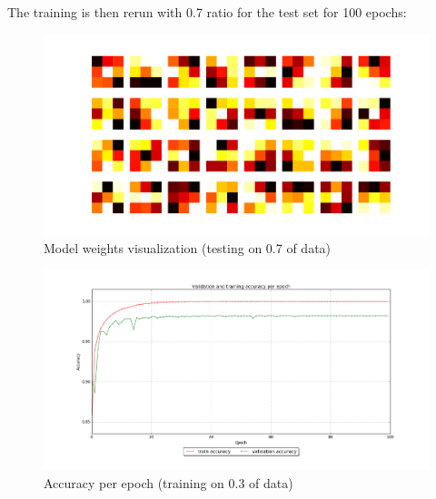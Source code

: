 \documentclass[paper=a4, fontsize=11pt]{scrartcl} %
\begin{document}
    The training is then rerun with 0.7 ratio for the test set for 100 epochs:
    \begin{figure}[H]
        \begin{center}
            \includegraphics[width=1.0\linewidth]{images/mnist_weights_more_test.png}
            \caption{Model weights visualization (testing on 0.7 of data)}
            \label{fig:weights_more_test}
        \end{center}
    \end{figure}
    \begin{figure}[H]
        \begin{center}
            \includegraphics[width=1.0\linewidth]{images/mnist_training_log_more_test.png}
            \caption{Accuracy per epoch (training on 0.3 of data)}
            \label{fig:train_more_test}
        \end{center}
    \end{figure}
\end{document}
